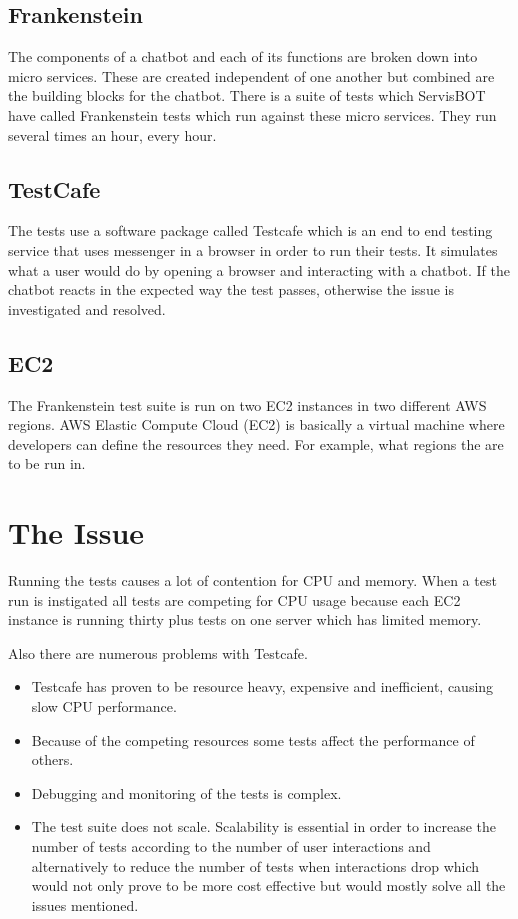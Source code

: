 \documentclass[12pt,a4paper,titlepage]{report}
\begin{document}
\subsection{Frankenstein}
The components of a chatbot and each of its functions are broken down into micro services. These are created independent of one another but combined are the building blocks for the chatbot. There is a suite of tests which ServisBOT have called Frankenstein tests which run against these micro services. They run several times an hour, every hour. 
\subsection{TestCafe}
The tests use a software package called Testcafe which is an end to end testing service that uses messenger in a browser in order to run their tests. It simulates what a user would do by opening a browser and interacting with a chatbot. If the chatbot reacts in the expected way the test passes, otherwise the issue is investigated and resolved.
\subsection{EC2}
The Frankenstein test suite is run on two EC2 instances in two different AWS regions. AWS Elastic Compute Cloud (EC2) is basically a virtual machine where developers can define the resources they need. For example, what regions the are to be run in. 
\section{The Issue}

Running the tests causes a lot of contention for CPU and memory. When a test run is instigated all tests are competing for CPU usage because each EC2 instance is running thirty plus tests on one server which has limited memory.

Also there are numerous problems with Testcafe. 
\begin{itemize}
 \item Testcafe has proven to be resource heavy, expensive and inefficient, causing slow CPU performance. 
 \item Because of the competing resources some tests affect the performance of others. 
 \item Debugging and monitoring of the tests is complex.
 \item The test suite does not scale. Scalability is essential in order to increase the number of tests according to the number of user interactions and alternatively to reduce the number of tests when interactions drop which would not only prove to be more cost effective but would mostly solve all the issues mentioned.
\end{itemize}
\end{document}
